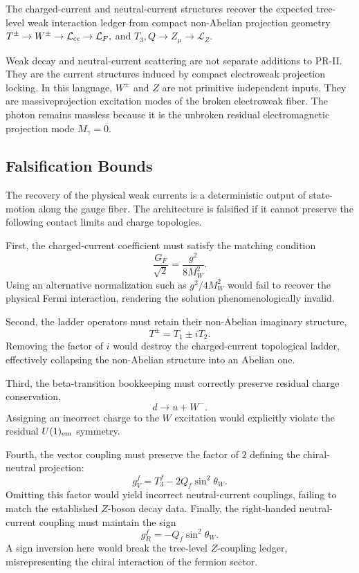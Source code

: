 \documentclass[11pt]{article}
\begin{document}
The charged-current and neutral-current structures recover the expected tree-level weak interaction ledger from compact non-Abelian projection geometry $T^\pm
\rightarrow
W^\pm
\rightarrow
\mathcal L_{\rm cc}
\rightarrow
\mathcal L_F,
$
and
$T_3,Q
\rightarrow
Z_\mu
\rightarrow
\mathcal L_Z.$

Weak decay and neutral-current scattering are not separate additions to PR-II. 
They are the current structures induced by compact electroweak projection locking. In this language, \(W^\pm\) and \(Z\) are not primitive independent inputs. 
They are massiveprojection excitation modes of the broken electroweak fiber. 
The photon remains massless because it is the unbroken residual electromagnetic projection mode $M_\gamma=0$.

\subsection{Falsification Bounds}
\label{sec:pr2_current_recovery_negative_controls}

The recovery of the physical weak currents is a deterministic output of state-motion along the gauge fiber. The architecture is falsified if it cannot preserve the following contact limits and charge topologies. 

First, the charged-current coefficient must satisfy the matching condition
\begin{equation}
\frac{G_F}{\sqrt2}
=
\frac{g^2}{8M_W^2}.
\end{equation}
Using an alternative normalization such as $g^2/4M_W^2$ would fail to recover the physical Fermi interaction, rendering the solution phenomenologically invalid.

Second, the ladder operators must retain their non-Abelian imaginary structure,
\begin{equation}
T^\pm=T_1\pm iT_2.
\end{equation}
Removing the factor of \(i\) would destroy the charged-current topological ladder, effectively collapsing the non-Abelian structure into an Abelian one. 

Third, the beta-transition bookkeeping must correctly preserve residual charge conservation,
\begin{equation}
d\rightarrow u+W^-.
\end{equation}
Assigning an incorrect charge to the $W$ excitation would explicitly violate the residual $U(1)_{\rm em}$ symmetry.

Fourth, the vector coupling must preserve the factor of $2$ defining the chiral-neutral projection:
\begin{equation}
g_V^f
=
T_3^f
-
2Q_f\sin^2\theta_W.
\end{equation}
Omitting this factor would yield incorrect neutral-current couplings, failing to match the established $Z$-boson decay data. Finally, the right-handed neutral-current coupling must maintain the sign
\begin{equation}
g_R^f=-Q_f\sin^2\theta_W.
\end{equation}
A sign inversion here would break the tree-level $Z$-coupling ledger, misrepresenting the chiral interaction of the fermion sector.
\end{document}
